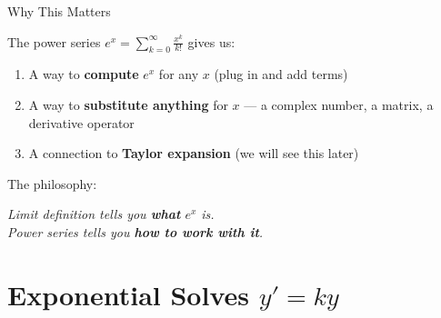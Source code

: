 \documentclass[10pt]{beamer}
\theoremstyle{definition}
\newcommand{\x}[1]{\alert{\textbf{#1}}}
\begin{document}
\begin{frame}{Why This Matters}

The power series $e^x = \displaystyle\sum_{k=0}^{\infty}\frac{x^k}{k!}$ gives us:

\vfill

\begin{enumerate}
\item A way to \x{compute} $e^x$ for any $x$ (plug in and add terms)
\item A way to \x{substitute anything} for $x$ --- a complex number, a matrix, a derivative operator
\item A connection to \x{Taylor expansion} (we will see this later)
\end{enumerate}

\vfill\pause

The philosophy:
\begin{center}
\it Limit definition tells you \x{what} $e^x$ is.\\[4pt]
Power series tells you \x{how to work with it}.
\end{center}

\end{frame}


\section{Exponential Solves $y' = ky$}
\end{document}
